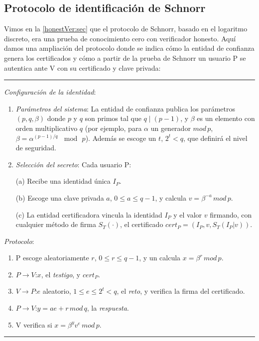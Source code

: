 

\subsection{Protocolo de identificación de Schnorr}

Vimos en la \autoref{honestVer:sec} que el protocolo de Schnorr, basado en el logaritmo discreto, era una prueba de conocimiento cero con verificador honesto. Aquí damos una ampliación del protocolo donde se indica cómo la entidad de confianza genera los certificados y cómo a partir de la prueba de Schnorr un usuario P se autentica ante V con su certificado y clave privada: 


\rule{\textwidth}{1pt}
\begin{algorithm}
	\hfil
	
	\textit{Configuración de la identidad}:
	\begin{enumerate}
		\item \textit{Parámetros del sistema}: La entidad de confianza publica los parámetros $(p,q,\beta)$ donde $p$ y $q$ son primos tal que $q\mid (p-1)$, y $\beta$ es un elemento con orden multiplicativo $q$ (por ejemplo, para $\alpha$ un generador $mod\,p$, $\beta=\alpha^{(p-1)/q}\,\mod\,p$). Además se escoge un $t$, $2^t < q$, que definirá el nivel de seguridad.
		
				
		\item \textit{Selección del secreto}: Cada usuario P:
		
		\subitem (a) Recibe una identidad única $I_P$.
		
		\subitem (b) Escoge una clave privada $a$, $0\leq a \leq q-1$, y calcula $v = \beta^{-a}\, mod\, p$.
		
		\subitem (c) La entidad certificadora vincula la identidad $I_P$ y el valor $v$ firmando, con cualquier método de firma $S_T(\cdot)$, el certificado $cert_P = (I_P, v, S_T(I_P|v))$.
		
	\end{enumerate}
	
	
	\textit{Protocolo}:
	\begin{enumerate}
		\item P escoge aleatoriamente $r$, $0\leq r\leq q-1$, y un calcula $x=\beta^r\,mod\,p$.
		\item $P \rightarrow V$:\quad $x$, el \textit{testigo}, y $cert_P$.
		\item $V \rightarrow P$:\quad $e$ aleatorio, $1\leq e\leq 2^t<q$, el \textit{reto}, y verifica la firma del certificado.
		\item $P \rightarrow V$:\quad $y=ae+r\, mod\, q$, la \textit{respuesta}.
		\item V verifica si \quad $ x = \beta^y v^e \, mod \, p$.
	\end{enumerate}
	
\end{algorithm}
\rule{\textwidth}{1pt}




